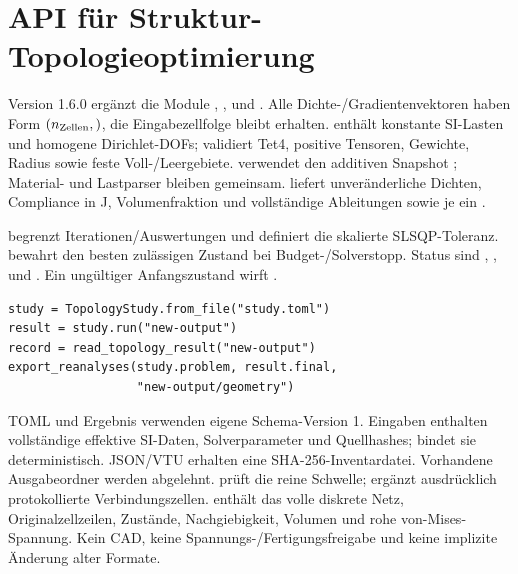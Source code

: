 \chapter{API für Struktur-Topologieoptimierung}\label{api:topology}
Version 1.6.0 ergänzt die Module ,
,  und .
Alle Dichte-/Gradientenvektoren haben Form \((n_{\rm Zellen},)\), die
Eingabezellfolge bleibt erhalten.  enthält konstante SI-Lasten
und homogene Dirichlet-DOFs;  validiert Tet4, positive
Tensoren, Gewichte, Radius sowie feste Voll-/Leergebiete.
 verwendet den additiven Snapshot
; Material- und Lastparser bleiben gemeinsam.
 liefert unveränderliche Dichten, Compliance in J,
Volumenfraktion und vollständige Ableitungen sowie je ein .

 begrenzt Iterationen/Auswertungen und definiert die
skalierte SLSQP-Toleranz.  bewahrt den besten zulässigen
Zustand bei Budget-/Solverstopp. Status sind ,
,  und .
Ein ungültiger Anfangszustand wirft .
\begin{lstlisting}
study = TopologyStudy.from_file("study.toml")
result = study.run("new-output")
record = read_topology_result("new-output")
export_reanalyses(study.problem, result.final,
                  "new-output/geometry")
\end{lstlisting}
TOML und Ergebnis verwenden eigene Schema-Version 1. Eingaben enthalten
vollständige effektive SI-Daten, Solverparameter und Quellhashes;
 bindet sie deterministisch. JSON/VTU erhalten eine
SHA-256-Inventardatei. Vorhandene Ausgabeordner werden abgelehnt.
 prüft die reine Schwelle;
 ergänzt ausdrücklich protokollierte Verbindungszellen.
 enthält das volle diskrete Netz, Originalzellzeilen,
Zustände, Nachgiebigkeit, Volumen und rohe von-Mises-Spannung. Kein CAD,
keine Spannungs-/Fertigungsfreigabe und keine implizite Änderung alter Formate.
